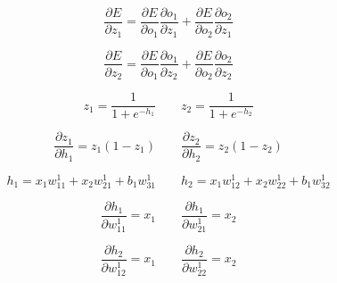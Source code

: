 \begin{equation*}
    \frac{\partial E}{\partial z_1} =
    \frac{\partial E}{\partial o_1} \frac{\partial o_1}{\partial z_1} +
    \frac{\partial E}{\partial o_2} \frac{\partial o_2}{\partial z_1}
\end{equation*}

\begin{equation*}
    \frac{\partial E}{\partial z_2} =
    \frac{\partial E}{\partial o_1} \frac{\partial o_1}{\partial z_2} +
    \frac{\partial E}{\partial o_2} \frac{\partial o_2}{\partial z_2}
\end{equation*}

\begin{equation}
    z_1 = \frac{1}{1+ e^{-h_1}}
    \qquad %
    z_2 = \frac{1}{1+ e^{-h_2}}
\end{equation}

\begin{equation*}
    \frac{\partial z_1}{\partial h_1} = z_1 (1 - z_1)
    \qquad %
    \frac{\partial z_2}{\partial h_2} = z_2 (1 - z_2)
\end{equation*}

\begin{equation}
    h_1 =  x_1 w_{11}^1 + x_2 w_{21}^1 + b_1 w_{31}^1
    \qquad %
    h_2 =  x_1 w_{12}^1 + x_2 w_{22}^1 + b_1 w_{32}^1
\end{equation}

\begin{equation*}
    \frac{\partial h_1}{\partial w_{11}^1} = x_1
    \qquad %
    \frac{\partial h_1}{\partial w_{21}^1} = x_2
\end{equation*}

\begin{equation*}
    \frac{\partial h_2}{\partial w_{12}^1} = x_1
    \qquad %
    \frac{\partial h_2}{\partial w_{22}^1} = x_2
\end{equation*}
